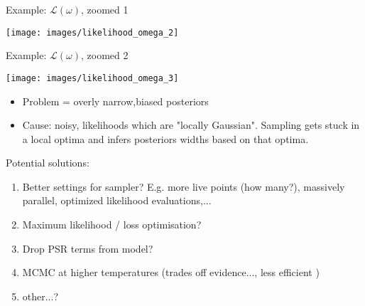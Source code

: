 \documentclass[10pt]{beamer}
\begin{document}
\begin{frame}{}
	
	Example: $\mathcal{L}(\omega)$, zoomed 1
	
	\texttt{[image: images/likelihood\_omega\_2]}
	
	
\end{frame}


\begin{frame}{}
	
	Example: $\mathcal{L}(\omega)$, zoomed 2
	
	\texttt{[image: images/likelihood\_omega\_3]}
	
	
\end{frame}






\begin{frame}{}
	
		\begin{itemize}
		\item \alert{Problem} = overly narrow,biased posteriors
		\item Cause: noisy, likelihoods which are "locally Gaussian". Sampling gets stuck in a local optima and infers posteriors widths based on that optima. 
%
	\end{itemize}
	
	
	
\end{frame}


\begin{frame}{}
	Potential solutions:
	
	\begin{enumerate}
		\item Better settings for sampler? E.g. more live points (how many?), massively parallel, optimized likelihood evaluations,...
		\item Maximum likelihood / loss optimisation? 
		\item Drop PSR terms from model?
		\item MCMC at higher temperatures (trades off evidence..., less efficient	)
		\item other...?
	\end{enumerate}
	
	
\end{frame}
\end{document}
